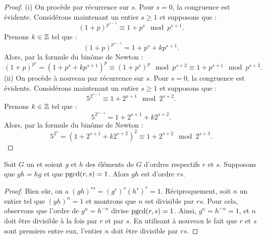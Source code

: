 \documentclass[]{report}
\begin{document}
\begin{proof}
    (i) On procède par récurrence sur $s$. Pour $s = 0$, la congruence est évidente. Considérons maintenant un entier $s \ge 1$ et supposons que :
    \[(1 + p)^{p^{s-1}} \equiv 1 + p^s \mod p^{s+1}.\]
    Prenons $k \in \mathbb{Z}$ tel que :
    \[(1 + p)^{p^{s-1}} = 1 + p^s + kp^{s+1}.\]
    Alors, par la formule du binôme de Newton :
    \[(1 + p)^{p^s} = (1 + p^s + kp^{s+1})^p \equiv (1 + p^s)^p \mod p^{s+2} \equiv 1 + p^{s+1} \mod p^{s+2}.\]
    (ii) On procède à nouveau par récurrence sur $s$. Pour $s = 0$, la congruence est évidente. Considérons maintenant un entier $s \ge 1$ et supposons que :
    \[5^{2^{s-1}} \equiv 1 + 2^{s+1} \mod 2^{s+2}.\]
    Prenons $k \in \mathbb{Z}$ tel que :
    \[5^{2^{s-1}} = 1 + 2^{s+1} + k 2^{s+2}.\]
    Alors, par la formule du binôme de Newton :
    \[5^{2^s} = (1 + 2^{s+1} + k2^{s+2})^2 \equiv 1 + 2^{s+2} \mod 2^{s+3}.\]
\end{proof}

\begin{lm}{}{}
    Soit $G$ un \gr et soient $g$ et $h$ des éléments de $G$ d'ordres respectifs $r$ et $s$. Supposons que $gh = hg$ et que $\text{pgcd}(r, s) = 1$. Alors $gh$ est d'ordre $rs$.
\end{lm}

\begin{proof}
    Bien sûr, on a $(gh)^{rs} = (g^r)^s (h^s)^r = 1$. Réciproquement, soit $n$ un entier tel que $(gh)^n = 1$ et montrons que $n$ est divisible par $rs$. Pour cela, observons que l'ordre de $g^n = h^{-n}$ divise $\text{pgcd}(r, s) = 1$. Ainsi, $g^n = h^{-n} = 1$, et $n$ doit être divisible à la fois par $r$ et par $s$. En utilisant à nouveau le fait que $r$ et $s$ sont premiers entre eux, l'entier $n$ doit être divisible par $rs$.
\end{proof}
\end{document}
